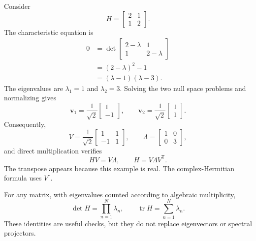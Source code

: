 Consider
\begin{equation}
  H=
  \begin{bmatrix}
    2 & 1\\
    1 & 2
  \end{bmatrix}.
\end{equation}
The characteristic equation is
\begin{align}
  0
  &=\det
    \begin{bmatrix}
      2-\lambda & 1\\
      1 & 2-\lambda
    \end{bmatrix}\\
  &=(2-\lambda)^2-1\\
  &=(\lambda-1)(\lambda-3).
\end{align}
The eigenvalues are \(\lambda_1=1\) and \(\lambda_2=3\). Solving the two null
space problems and normalizing gives
\begin{equation}
  \mathbf v_1=\frac{1}{\sqrt2}
  \begin{bmatrix}1\\-1\end{bmatrix},
  \qquad
  \mathbf v_2=\frac{1}{\sqrt2}
  \begin{bmatrix}1\\1\end{bmatrix}.
\end{equation}
Consequently,
\begin{equation}
  V=\frac{1}{\sqrt2}
  \begin{bmatrix}
    1 & 1\\
    -1 & 1
  \end{bmatrix},
  \qquad
  \Lambda=
  \begin{bmatrix}
    1 & 0\\
    0 & 3
  \end{bmatrix},
\end{equation}
and direct multiplication verifies
\begin{equation}
  HV=V\Lambda,
  \qquad
  H=V\Lambda V^{\mathsf T}.
\end{equation}
The transpose appears because this example is real. The complex-Hermitian
formula uses \(V^{\dagger}\).

For any matrix, with eigenvalues counted according to algebraic multiplicity,
\begin{equation}
  \det H=\prod_{n=1}^{N}\lambda_n,
  \qquad
  \operatorname{tr}H=\sum_{n=1}^{N}\lambda_n.
\end{equation}
These identities are useful checks, but they do not replace eigenvectors or
spectral projectors.

